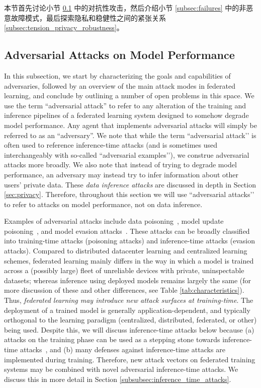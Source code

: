 本节首先讨论小节 \ref{subsec:adversarial_attacks} 中的对抗性攻击，然后介绍小节 \ref{subsec:failures} 中的非恶意故障模式，最后探索隐私和稳健性之间的紧张关系 \ref{subsec:tension_privacy_robustness}。
\subsection{Adversarial Attacks on Model Performance}
\label{subsec:adversarial_attacks}

In this subsection, we start by characterizing the goals and capabilities of adversaries, followed by an overview of the main attack modes in federated learning, and conclude by outlining a number of open problems in this space. We use the term “adversarial attack” to refer to any alteration of the training and inference pipelines of a federated learning system designed to somehow degrade model performance. Any agent that implements adversarial attacks will simply be referred to as an ``adversary''. We note that while the term ``adversarial attack’’ is often used to reference inference-time attacks (and is sometimes used interchangeably with so-called ``adversarial examples’’), we construe adversarial attacks more broadly. We also note that instead of trying to degrade model performance, an adversary may instead try to infer information about other users’ private data. These \textit{data inference attacks} are discussed in depth in Section \ref{sec:privacy}. Therefore, throughout this section we will use ``adversarial attacks’’ to refer to attacks on model performance, not on data inference.

Examples of adversarial attacks include data poisoning~\citep{Biggio:2012:PAA:3042573.3042761, DBLP:conf/ndss/LiuMALZW018}, model update poisoning~\citep{bagdasaryan18backdoor, pmlr-v97-bhagoji19a}, and model evasion attacks~\citep{szegedy2013intriguing, Biggio:2012:PAA:3042573.3042761, DBLP:journals/corr/GoodfellowSS14}. These attacks can be broadly classified into training-time attacks (poisoning attacks) and inference-time attacks (evasion attacks). Compared to distributed datacenter learning and centralized learning schemes, federated learning mainly differs in the way in which a model is trained across a (possibly large) fleet of unreliable devices with private, uninspectable datasets; whereas inference using deployed models remains largely the same (for more discussion of these and other differences, see Table \ref{tab:characteristics}). Thus, \emph{federated learning may introduce new attack surfaces at training-time}. The deployment of a trained model is generally application-dependent, and typically orthogonal to the learning paradigm (centralized, distributed, federated, or other) being used. Despite this, we will discuss inference-time attacks below because (a) attacks on the training phase can be used as a stepping stone towards inference-time attacks~\citep{DBLP:conf/ndss/LiuMALZW018,pmlr-v97-bhagoji19a}, and (b) many defenses against inference-time attacks are implemented during training. Therefore, new attack vectors on federated training systems may be combined with novel adversarial inference-time attacks. We discuss this in more detail in Section \ref{subsubsec:inference_time_attacks}.

